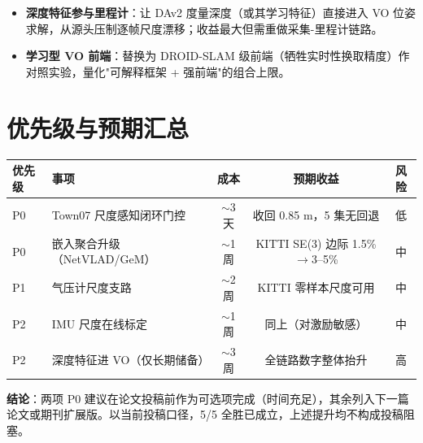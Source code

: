 \documentclass[11pt]{article}
\begin{document}
\begin{itemize}[nosep]
  \item \textbf{深度特征参与里程计}：让 DAv2 度量深度（或其学习特征）直接进入 VO 位姿求解，从源头压制逐帧尺度漂移；收益最大但需重做采集-里程计链路。
  \item \textbf{学习型 VO 前端}：替换为 DROID-SLAM 级前端（牺牲实时性换取精度）作对照实验，量化"可解释框架 + 强前端"的组合上限。
\end{itemize}

\section{优先级与预期汇总}

\begin{table}[h]
\centering
\small
\begin{tabular}{@{}llccc@{}}
\toprule
优先级 & 事项 & 成本 & 预期收益 & 风险 \\
\midrule
P0 & Town07 尺度感知闭环门控 & $\sim$3 天 & 收回 0.85 m，5 集无回退 & 低 \\
P0 & 嵌入聚合升级（NetVLAD/GeM） & $\sim$1 周 & KITTI SE(3) 边际 1.5\%$\to$3--5\% & 中 \\
P1 & 气压计尺度支路 & $\sim$2 周 & KITTI 零样本尺度可用 & 中 \\
P2 & IMU 尺度在线标定 & $\sim$1 周 & 同上（对激励敏感） & 中 \\
P2 & 深度特征进 VO（仅长期储备） & $\sim$3 周 & 全链路数字整体抬升 & 高 \\
\bottomrule
\end{tabular}
\end{table}

\textbf{结论}：两项 P0 建议在论文投稿前作为可选项完成（时间充足），其余列入下一篇论文或期刊扩展版。以当前投稿口径，5/5 全胜已成立，上述提升均不构成投稿阻塞。
\end{document}
